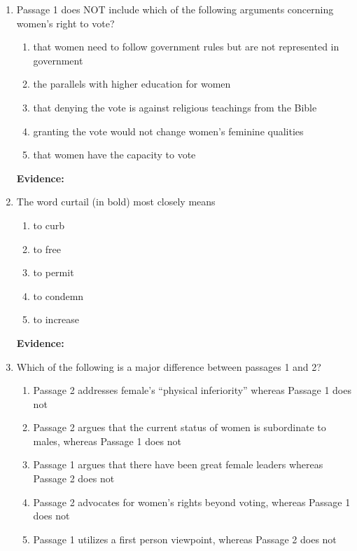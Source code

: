 \bigskip
\begin{enumerate}

\item Passage 1 does NOT include which of the following arguments concerning women's right to vote?

\bigskip
\begin{enumerate}[label=(\Alph*)]
\item that women need to follow government rules but are not represented in government
\item the parallels with higher education for women 
\item that denying the vote is against religious teachings from the Bible
\item granting the vote would not change women's feminine qualities
\item that women have the capacity to vote
\end{enumerate}

\bigskip
\textbf{Evidence:} \hrulefill

\bigskip
\item The word curtail (in bold) most closely means

\bigskip
\begin{enumerate}[label=(\Alph*)]
\item to curb
\item to free
\item to permit
\item to condemn 
\item to increase
\end{enumerate}

\bigskip
\textbf{Evidence:} \hrulefill

\bigskip
\item 

\bigskip Which of the following is a major difference between passages 1 and 2?
\begin{enumerate}[label=(\Alph*)]
\item Passage 2 addresses female's ``physical inferiority'' whereas Passage 1 does not
\item Passage 2 argues that the current status of women is subordinate to males, whereas Passage 1 does not
\item Passage 1 argues that there have been great female leaders whereas Passage 2 does not
\item Passage 2 advocates for women's rights beyond voting, whereas Passage 1 does not
\item Passage 1 utilizes a first person viewpoint, whereas Passage 2 does not
\end{enumerate}


\end{enumerate}
